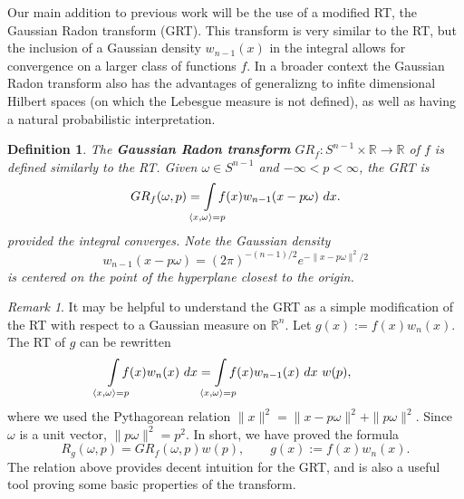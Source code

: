 \documentclass{amsart}
\newtheorem{definition}[theorem]{Definition}
\theoremstyle{remark}
\newtheorem{remark}[theorem]{Remark}
\numberwithin{equation}{section}
\newcommand{\RR}{\mathbb{R}}
\def\mclimits_#1{\limits_{\mathclap{#1}}}
\begin{document}
Our main addition to previous work will be the use of a modified RT, the Gaussian Radon transform (GRT). This transform is very similar to the RT, but the inclusion of a Gaussian density $w_{n-1}(x)$ in the integral allows for convergence on a larger class of functions $f$. In a broader context the Gaussian Radon transform also has the advantages of generalizng to infite dimensional Hilbert spaces \cite{Seng14} (on which the Lebesgue measure is not defined), as well as having a natural probabilistic interpretation.


\begin{definition}
The \textbf{Gaussian Radon transform} $GR_f : S^{n-1} \times \RR \rightarrow \RR$ of $f$ is defined similarly to the RT. Given $\omega \in S^{n-1}$ and $-\infty < p < \infty$, the GRT is
\[
    GR_f(\omega, p) = 
    \int\mclimits_{\langle x, \omega \rangle = p} f(x) w_{n-1}(x - p\omega) ~dx.
\]
provided the integral converges. Note the Gaussian density 
\[
    w_{n-1}(x - p\omega) = (2\pi)^{-(n-1)/2}e^{-\|x - p\omega\|^2/2}
\] 
is centered on the point of the hyperplane closest to the origin.
\end{definition}

\begin{remark}
It may be helpful to understand the GRT as a simple modification of the RT with respect to a Gaussian measure on $\RR^n$. Let $g(x) := f(x)w_n(x)$. The RT of $g$ can be rewritten
\begin{align*}
    \int\mclimits_{\langle x, \omega \rangle = p} f(x) w_n(x) ~dx
    &= \int\mclimits_{\langle x, \omega \rangle = p} f(x) w_{n-1}(x) ~dx~ w(p),
\end{align*}
where we used the Pythagorean relation $\|x\|^2 = \|x - p\omega\|^2 + \|p\omega\|^2$. Since $\omega$ is a unit vector, $\|p\omega\|^2 = p^2$. In short, we have proved the formula
\begin{equation}
    \label{eq:GRTPythag}
    R_g(\omega, p) = GR_f(\omega, p) w(p), \qquad g(x) := f(x)w_n(x).
\end{equation}
The relation above provides decent intuition for the GRT, and is also a useful tool proving some basic properties of the transform.
\end{remark}
\end{document}
